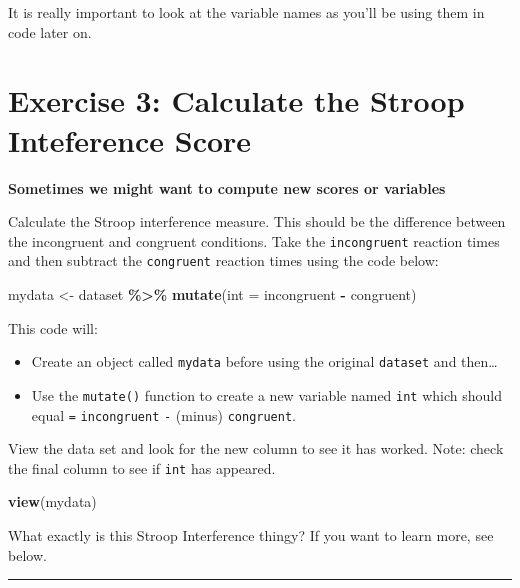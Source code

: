 \documentclass[
]{book}
\newenvironment{Shaded}{\begin{snugshade}}{\end{snugshade}}
\newcommand{\AttributeTok}[1]{\textcolor[rgb]{0.13,0.29,0.53}{#1}}
\newcommand{\FunctionTok}[1]{\textcolor[rgb]{0.13,0.29,0.53}{\textbf{#1}}}
\newcommand{\NormalTok}[1]{#1}
\newcommand{\OtherTok}[1]{\textcolor[rgb]{0.56,0.35,0.01}{#1}}
\newcommand{\SpecialCharTok}[1]{\textcolor[rgb]{0.81,0.36,0.00}{\textbf{#1}}}
\let\oldsection\section
\renewcommand{\section}{\needspace{5\baselineskip}\oldsection}
\begin{document}
It is really important to look at the variable names as you'll be using them in code later on.

\section{Exercise 3: Calculate the Stroop Inteference Score}\label{exercise-3-calculate-the-stroop-inteference-score}

\textbf{Sometimes we might want to compute new scores or variables}

Calculate the Stroop interference measure. This should be the difference between the incongruent and congruent conditions. Take the \texttt{incongruent} reaction times and then subtract the \texttt{congruent} reaction times using the code below:

\begin{Shaded}
\begin{Highlighting}[]
\NormalTok{mydata }\OtherTok{\textless{}{-}}\NormalTok{ dataset }\SpecialCharTok{\%\textgreater{}\%}
  \FunctionTok{mutate}\NormalTok{(}\AttributeTok{int =}\NormalTok{ incongruent }\SpecialCharTok{{-}}\NormalTok{ congruent)}
\end{Highlighting}
\end{Shaded}

This code will:

\begin{itemize}
\item
  Create an object called \texttt{mydata} before using the original \texttt{dataset} and then\ldots{}
\item
  Use the \texttt{mutate()} function to create a new variable named \texttt{int} which should equal \texttt{=} \texttt{incongruent} \texttt{-} (minus) \texttt{congruent}.
\end{itemize}

View the data set and look for the new column to see it has worked. Note: check the final column to see if \texttt{int} has appeared.

\begin{Shaded}
\begin{Highlighting}[]
\FunctionTok{view}\NormalTok{(mydata)}
\end{Highlighting}
\end{Shaded}

What exactly is this Stroop Interference thingy? If you want to learn more, see below.

\begin{center}\rule{0.5\linewidth}{0.5pt}\end{center}
\end{document}
